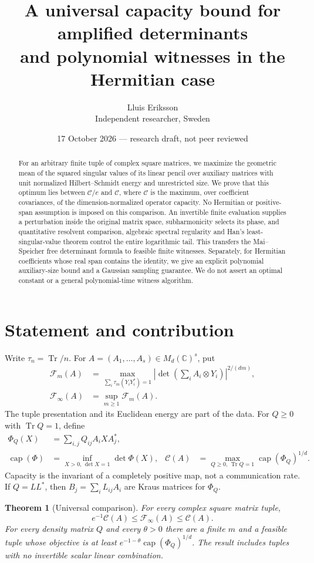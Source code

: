 \documentclass[11pt]{article}
\title{A universal capacity bound for amplified determinants\\and polynomial witnesses in the Hermitian case}
\author{Lluis Eriksson\\Independent researcher, Sweden}
\date{17 October 2026 --- research draft, not peer reviewed}
\newtheorem{theorem}{Theorem}
\newcommand{\C}{\mathbb C}
\newcommand{\Tr}{\operatorname{Tr}}
\newcommand{\capop}{\operatorname{cap}}
\newcommand{\F}{\mathcal F}
\newcommand{\K}{\mathcal C}
\begin{document}
\maketitle
\begin{abstract}
For an arbitrary finite tuple of complex square matrices, we maximize the geometric mean of the squared singular values of its linear pencil over auxiliary matrices with unit normalized Hilbert--Schmidt energy and unrestricted size. We prove that this optimum lies between $\K/e$ and $\K$, where $\K$ is the maximum, over coefficient covariances, of the dimension-normalized operator capacity. No Hermitian or positive-span assumption is imposed on this comparison. An invertible finite evaluation supplies a perturbation inside the original matrix space, subharmonicity selects its phase, and quantitative resolvent comparison, algebraic spectral regularity and Han's least-singular-value theorem control the entire logarithmic tail. This transfers the Mai--Speicher free determinant formula to feasible finite witnesses. Separately, for Hermitian coefficients whose real span contains the identity, we give an explicit polynomial auxiliary-size bound and a Gaussian sampling guarantee. We do not assert an optimal constant or a general polynomial-time witness algorithm.
\end{abstract}

\section{Statement and contribution}
Write $\tau_n=\Tr/n$. For $A=(A_1,\ldots,A_s)\in M_d(\C)^s$, put
\begin{align}
 \F_m(A)&=\max_{\sum_i\tau_m(Y_iY_i^*)=1}
 \left|\det\left(\sum_i A_i\otimes Y_i\right)\right|^{2/(dm)},\label{eq:F}\\
 \F_\infty(A)&=\sup_{m\ge1}\F_m(A).
\end{align}
The tuple presentation and its Euclidean energy are part of the data. For $Q\ge0$ with $\Tr Q=1$, define
\begin{align}
 \Phi_Q(X)&=\sum_{i,j}Q_{ij}A_iXA_j^*,\\
 \capop(\Phi)&=\inf_{X>0,\,\det X=1}\det\Phi(X),&
 \K(A)&=\max_{Q\ge0,\,\Tr Q=1}\capop(\Phi_Q)^{1/d}.\label{eq:C}
\end{align}
Capacity is the invariant of a completely positive map, not a communication rate. If $Q=LL^*$, then $B_j=\sum_iL_{ij}A_i$ are Kraus matrices for $\Phi_Q$.

\begin{theorem}[Universal comparison]\label{thm:universal}
For every complex square matrix tuple,
\begin{equation}\label{eq:universal}
 e^{-1}\K(A)\le\F_\infty(A)\le\K(A).
\end{equation}
For every density matrix $Q$ and every $\theta>0$ there are a finite $m$ and a feasible tuple whose objective is at least $e^{-1-\theta}\capop(\Phi_Q)^{1/d}$. The result includes tuples with no invertible scalar linear combination.
\end{theorem}
\end{document}
